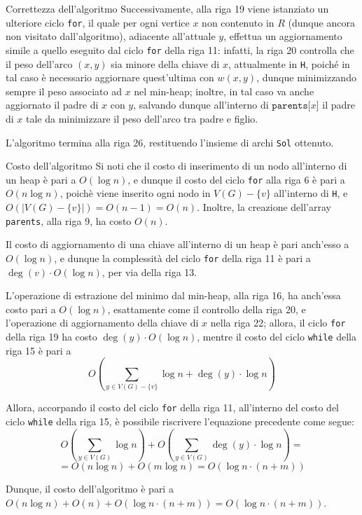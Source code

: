 \documentclass[a4paper, 12pt]{report}
\begin{document}
\begin{framedobs}{Correttezza dell'algoritmo}
        Successivamente, alla riga 19 viene istanziato un ulteriore ciclo \texttt{for}, il quale per ogni vertice $x$ non contenuto in $R$ (dunque ancora non visitato dall'algoritmo), adiacente all'attuale $y$, effettua un aggiornamento simile a quello eseguito dal ciclo \texttt{for} della riga 11: infatti, la riga 20 controlla che il peso dell'arco $(x, y)$ sia minore della chiave di $x$, attualmente in \texttt{H}, poiché in tal caso è necessario aggiornare quest'ultima con $w(x, y)$, dunque minimizzando sempre il peso associato ad $x$ nel min-heap; inoltre, in tal caso va anche aggiornato il padre di $x$ con $y$, salvando dunque all'interno di $\texttt{parents[}x\texttt{]}$ il padre di $x$ tale da minimizzare il peso dell'arco tra padre e figlio.

        L'algoritmo termina alla riga 26, restituendo l'insieme di archi \texttt{Sol} ottenuto.
    \end{framedobs}

    \begin{framedobs}{Costo dell'algoritmo}
        Si noti che il costo di inserimento di un nodo all'interno di un heap è pari a $O(\log n)$, e dunque il costo del ciclo \texttt{for} alla riga 6 è pari a $O (n \log n)$, poichè viene inserito ogni nodo in $V(G) - \{v\}$ all'interno di \texttt{H}, e $O(|V(G) - \{v\}|) = O(n - 1) = O(n)$. Inoltre, la creazione dell'array \texttt{parents}, alla riga 9, ha costo $O(n)$.

        Il costo di aggiornamento di una chiave all'interno di un heap è pari anch'esso a $O(\log n)$, e dunque la complessità del ciclo \texttt{for} della riga 11 è pari a $\deg(v) \cdot O(\log n)$, per via della riga 13.

        L'operazione di estrazione del minimo dal min-heap, alla riga 16, ha anch'essa costo pari a $O(\log n)$, esattamente come il controllo della riga 20, e l'operazione di aggiornamento della chiave di $x$ nella riga 22; allora, il ciclo \texttt{for} della riga 19 ha costo $\deg(y) \cdot O(\log n)$, mentre il costo del ciclo \texttt{while} della riga 15 è pari a $$\displaystyle O\left(\sum_{y \in V(G) - \{v\}}{\log n + \deg(y) \cdot \log n}\right)$$

        Allora, accorpando il costo del ciclo \texttt{for} della riga 11, all'interno del costo del ciclo \texttt{while} della riga 15, è possibile riscrivere l'equazione precedente come segue: $$\displaystyle O\left(\sum_{y \in V(G)} {\log n}\right) + O \left(\sum_{y \in V(G)}{\deg(y) \cdot \log n}\right) = $$ $$= O(n \log n ) + O(m \log n) = O(\log n \cdot( n + m))$$

        Dunque, il costo dell'algoritmo è pari a $O(n \log n) + O(n) + O(\log n \cdot (n + m)) = O(\log n \cdot (n + m))$.
    \end{framedobs}
\end{document}
